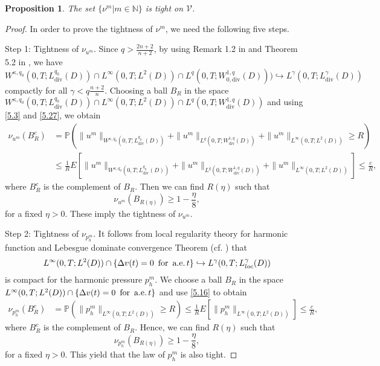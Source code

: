 \documentclass[reqno]{amsart}
\newtheorem{Proposition}{Proposition}[section]
\theoremstyle{definition}
\theoremstyle{remark}
\numberwithin{equation}{section} \allowdisplaybreaks
\begin{document}
\begin{Proposition}
The set $\{\nu^m|m\in\mathbb{N}\}$ is tight on $\mathcal{V}$.
\end{Proposition}
\begin{proof}
In order to prove the tightness of $\nu^m$, we need  the following
five steps.

{Step 1: Tightness of $\nu_{u^m}$.} Since $q>\frac{2n+2}{n+2}$, by
using Remark 1.2 in \cite{JW} and Theorem 5.2 in \cite{HA}, we have
$$W^{\kappa,q_0}(0,T;L^{q_0}_{\text{div}}(D))\cap L^\infty(0,T;L^2(D))\cap L^{q}(0,T;W^{1,q}_{0,\text{div}}(D)))\hookrightarrow L^\gamma(0,T;L^\gamma_{\text{div}}(D))$$
compactly for all $\gamma<q\frac{n+2}{n}$. Choosing a ball $B_R$ in
the space $W^{\kappa,q_0}(0,T;L^{q_0}_{\text{div}}(D))\cap
L^\infty(0,T;L^2(D))\cap L^{q}(0,T;W^{1,q}_{\text{div}}(D))$ and
using \eqref{5.3} and \eqref{5.27}, we obtain
\begin{equation*}
\begin{split}
\nu_{u^m}(B_R^c)&=\mathbb{P}(\|u^m\|_{W^{\kappa,q_0}(0,T;L_{\text{div}}^{q_0}(D))}+\|u^m\|_{L^{q}(0,T;W^{1,q}_{\text{div}}(D))}+\|u^m\|_{L^{\infty}(0,T;L^{2}(D))}\geq R)\\
&\leq
\frac{1}{R}E\left[\|u^m\|_{W^{\kappa,q_0}(0,T;L_{\text{div}}^{q_0}(D))}+\|u^m\|_{L^{q}(0,T;W^{1,q}_{\text{div}}(D))}+\|u^m\|_{L^{\infty}(0,T;L^{2}(D))}\right]\leq\frac{c}{R},
\end{split}
\end{equation*}
where $B_R^c$ is the complement of $B_R$. Then we can find $R(\eta)$
such that
$$\nu_{u^m}(B_{R(\eta)})\geq 1-\frac{\eta}{8},$$
for a fixed $\eta>0$. These imply the tightness of $\nu_{u^m}$.

{Step 2: Tightness of $\nu_{p_h^m}$.} It follows from local
regularity theory for harmonic function and Lebesgue dominate
convergence Theorem (cf. \cite{JW}) that
$$L^\infty(0,T;L^2(D))\cap\{\Delta v(t)=0\, \text{ for \,a.e.}\, t\}\hookrightarrow L^\gamma(0,T;L^\gamma_{loc}(D))$$
is compact for the harmonic pressure $p_h^m$.  We choose a ball
$B_R$ in the space $L^\infty(0,T;L^2(D))\cap\{\Delta v(t)=0\, \text{
for \,a.e.}\, t\}$ and use \eqref{5.16} to obtain
\begin{equation*}
\begin{split}
\nu_{p_h^m}(B_R^c)&=\mathbb{P}(\|p_h^m\|_{L^{\infty}(0,T;L^{2}(D))}\geq R)\leq
\frac{1}{R}E\left[\|p_h^m\|_{L^{\infty}(0,T;L^{2}(D))}\right]\leq\frac{c}{R},
\end{split}
\end{equation*}
where $B_R^c$ is the complement of $B_R$. Hence, we can find
$R(\eta)$ such that
$$\nu_{p_h^m}(B_{R(\eta)})\geq 1-\frac{\eta}{8},$$
for a fixed $\eta>0$. This yield
that the law of $p_h^m$ is also tight.


\end{proof}
\end{document}
